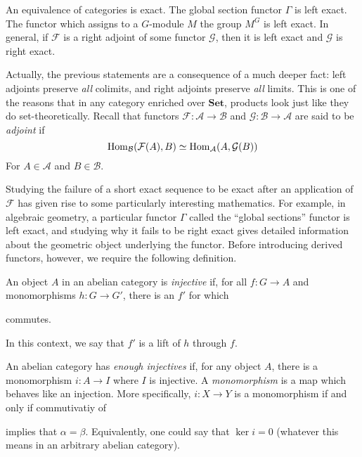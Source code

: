 \begin{example}
    An equivalence of categories is exact. The global section functor $\Gamma$ is left exact. The functor which assigns to a $G$-module $M$ the group $M^G$ is left exact. In general, if $\mathcal{F}$ is a right adjoint of some functor $\mathcal{G}$, then it is left exact and $\mathcal{G}$ is right exact.
\end{example}

\begin{remark}
    Actually, the previous statements are a consequence of a much deeper fact: left adjoints preserve \textit{all} colimits, and right adjoints preserve \textit{all} limits. This is one of the reasons that in any category enriched over $\mathbf{Set}$, products look just like they do set-theoretically. Recall that functors $\mathcal{F} : \mathcal{A} \to \mathcal{B}$ and $\mathcal{G} : \mathcal{B} \to \mathcal{A}$ are said to be \textit{adjoint} if
    \[
        \operatorname{Hom}_\mathcal{B}(\mathcal{F}(A), B) \simeq \operatorname{Hom}_\mathcal{A}(A, \mathcal{G}(B))
    \]
    For $A \in \mathcal{A}$ and $B \in \mathcal{B}$.
\end{remark}

Studying the failure of a short exact sequence to be exact after an application of $\mathcal{F}$ has given rise to some particularly interesting mathematics. For example, in algebraic geometry, a particular functor $\Gamma$ called the ``global sections'' functor is left exact, and studying why it fails to be right exact gives detailed information about the geometric object underlying the functor. Before introducing derived functors, however, we require the following definition.

\begin{definition}
    An object $A$ in an abelian category is \textit{injective} if, for all $f : G \to A$ and monomorphisms $h : G \to G'$, there is an $f'$ for which
    \begin{center}
        \quad commutes.
    \end{center}
    In this context, we say that $f'$ is a lift of $h$ through $f$.
\end{definition}

An abelian category has \textit{enough injectives} if, for any object $A$, there is a monomorphism $i : A \to I$ where $I$ is injective. A \textit{monomorphism} is a map which behaves like an injection. More specifically, $i : X \to Y$ is a monomorphism if and only if commutivatiy of
\begin{center}
\end{center}
implies that $\alpha = \beta$. Equivalently, one could say that $\ker{i} = 0$ (whatever this means in an arbitrary abelian category).

